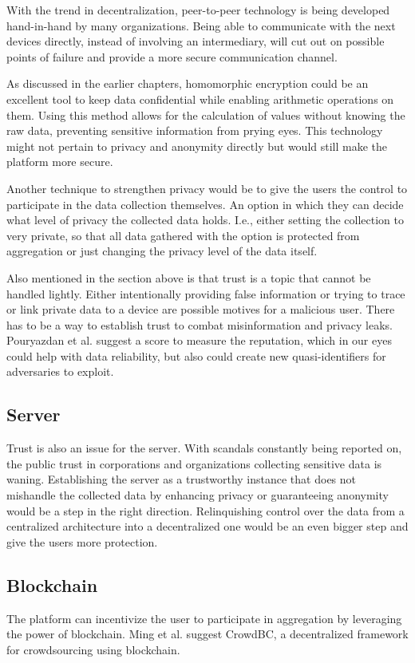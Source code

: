 With the trend in decentralization, peer-to-peer technology is being developed hand-in-hand by many organizations. Being able to communicate with the next devices directly, instead of involving an intermediary, will cut out on possible points of failure and provide a more secure communication channel.

As discussed in the earlier chapters, homomorphic encryption could be an excellent tool to keep data confidential while enabling arithmetic operations on them. Using this method allows for the calculation of values without knowing the raw data, preventing sensitive information from prying eyes. This technology might not pertain to privacy and anonymity directly but would still make the platform more secure.

Another technique to strengthen privacy would be to give the users the control to participate in the data collection themselves. An option in which they can decide what level of privacy the collected data holds. I.e., either setting the collection to very private, so that all data gathered with the option is protected from aggregation or just changing the privacy level of the data itself.

Also mentioned in the section above is that trust is a topic that cannot be handled lightly. Either intentionally providing false information or trying to trace or link private data to a device are possible motives for a malicious user. There has to be a way to establish trust to combat misinformation and privacy leaks. Pouryazdan et al. \cite{DBLP:journals/access/PouryazdanKSFS17} suggest a score to measure the reputation, which in our eyes could help with data reliability, but also could create new quasi-identifiers for adversaries to exploit.
 
\subsection{Server}
Trust is also an issue for the server. With scandals constantly being reported on, the public trust in corporations and organizations collecting sensitive data is waning. Establishing the server as a trustworthy instance that does not mishandle the collected data by enhancing privacy or guaranteeing anonymity would be a step in the right direction. Relinquishing control over the data from a centralized architecture into a decentralized one would be an even bigger step and give the users more protection.

\subsection{Blockchain}
The platform can incentivize the user to participate in aggregation by leveraging the power of blockchain. Ming et al. \cite{DBLP:journals/tpds/LiWYLZHLXD19} suggest CrowdBC, a decentralized framework for crowdsourcing using blockchain. 

